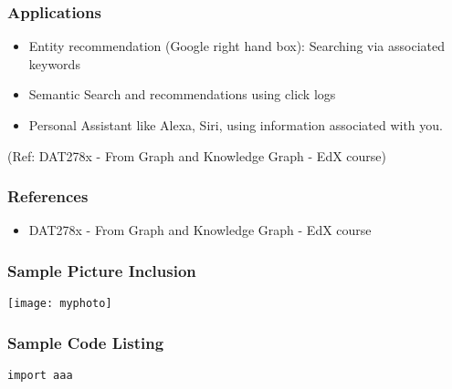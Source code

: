 \begin{frame}\frametitle{Applications}

\begin{itemize}
\item Entity recommendation (Google right hand box): Searching via associated keywords
\item Semantic Search and recommendations using click logs
\item Personal Assistant like Alexa, Siri, using information associated with you.
\end{itemize}

{\tiny (Ref: DAT278x - From Graph and Knowledge Graph - EdX course)}
\end{frame}











\begin{frame}[fragile]\frametitle{References}

\begin{itemize}
\item DAT278x - From Graph and Knowledge Graph - EdX course
\end{itemize}
	  
\end{frame}
















\begin{frame}[fragile]\frametitle{Sample Picture Inclusion}

\begin{center}
\texttt{[image: myphoto]}
\end{center}	  
\end{frame}

\begin{frame}[fragile] \frametitle{Sample Code Listing}
\begin{lstlisting}
import aaa
\end{lstlisting}

\end{frame}


